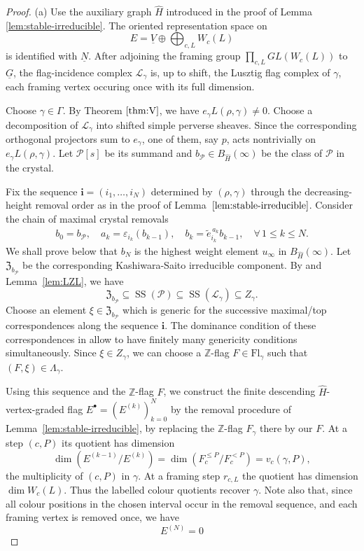 \documentclass[11pt,reqno]{amsart}
\theoremstyle{definition}
\theoremstyle{remark}
\def\bbZ{\mathbb Z}
\def\dN{\underline N}
\def\dG{\underline G}
\def\dV{\underline V}
\def\Fl{\mathrm{Fl}}
\begin{document}
\begin{proof}
(a) 
Use the auxiliary  graph $\widehat H$ introduced in the proof of Lemma \ref{lem:stable-irreducible}.
The oriented representation space on
$$E=\dV\oplus\bigoplus_{c,L}W_c(L)$$ 
 is identified with $\dN$.
After adjoining the framing group $\prod_{c,L}GL(W_c(L))$ to $\dG$,
the flag-incidence complex $\mathscr L_\gamma$ is, up to shift, the Lusztig flag complex  of $\gamma$, 
each framing vertex occuring once with its full dimension.

Choose $\gamma\in\Gamma$.
By Theorem \(\ref{thm:V}\), we have \(e_\gamma L(\rho,\gamma)\neq0\). Choose a decomposition of \(\mathscr L_\gamma\) into shifted simple 
perverse sheaves. Since the corresponding orthogonal projectors sum to \(e_\gamma\), one of them, say \(p\), acts nontrivially on 
\(e_\gamma L(\rho,\gamma)\). Let \(\mathcal P[s]\) be its summand and $b_{\mathcal P}\in B_{\widehat H}(\infty)$ 
be the class of $\mathcal P$ in the crystal.

Fix the sequence \(\mathbf i=(i_1,\ldots,i_N)\) determined by \((\rho,\gamma)\) through the decreasing-height removal order as in the proof of
Lemma~\(\ref{lem:stable-irreducible}\). 
Consider the chain of maximal crystal removals
\begin{align}\label{IB}
 b_0=b_{\mathcal P},\quad
 a_k=\varepsilon_{i_k}(b_{k-1}),\quad
 b_k=\widetilde e_{i_k}^{\,a_k}b_{k-1}
, \quad \forall\,1\leqslant k\leqslant N.
\end{align}
We shall prove below that $b_N$ is the highest weight element $u_\infty$ in $B_{\widehat{H}}(\infty)$.
Let $\mathfrak Z_{b_{\mathcal P}}$ be the corresponding Kashiwara-Saito irreducible component. By
\cite[Thm.~6.2.2]{KS97} and Lemma~\ref{lem:LZL}, we have
\[
 \mathfrak Z_{b_{\mathcal P}}\subseteq\operatorname{SS}(\mathcal P)
 \subseteq\operatorname{SS}(\mathscr L_\gamma)\subseteq Z_\gamma.
\]
Choose an element $\xi\in\mathfrak Z_{b_{\mathcal P}}$ which is generic for the successive
maximal/top correspondences along the sequence $\mathbf i$. 
The dominance condition of these correspondences in 
\cite[Lem.~5.2.3, Prop.~5.2.4, Thm.~5.3.2]{KS97} allow to have
finitely many genericity conditions simultaneously.
Since $\xi\in Z_\gamma$, we can choose a
$\bbZ$-flag $F\in\Fl_\gamma$ such that $(F,\xi)\in\Lambda_\gamma$.

Using this sequence and the $\mathbb Z$-flag $F$, we construct the finite
descending $\widehat H$-vertex-graded flag
$E^\bullet=(E^{(k)})_{k=0}^N$ by the removal procedure of
Lemma~\ref{lem:stable-irreducible}, by replacing the $\mathbb Z$-flag $F_\gamma$ there by our $F$. 
At a step $(c,P)$ its quotient
has dimension
\[
 \dim(E^{(k-1)}/E^{(k)})
 =\dim(F_c^{\leqslant P}/F_c^{<P})=v_c(\gamma,P),
\]
the multiplicity of $(c,P)$ in $\gamma$. At a framing step
$r_{c,L}$ the quotient has dimension $\dim W_c(L)$.
Thus the labelled colour quotients recover $\gamma$.
Note also that,
since all colour positions in the chosen interval occur in the removal sequence, 
and each framing vertex is removed once, we have $$E^{(N)}=0$$



\end{proof}
\end{document}
